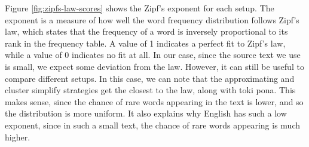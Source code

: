 Figure \ref{fig:zipfs-law-scores} shows the Zipf's exponent for each setup. The exponent is a measure of how well the word frequency distribution follows Zipf's law,
which states that the frequency of a word is inversely proportional to its rank in the frequency table.
A value of 1 indicates a perfect fit to Zipf's law, while a value of 0 indicates no fit at all. In our case, since the source text we use is small, we expect
some deviation from the law. However, it can still be useful to compare different setups. In this case, we can note that the approximating and cluster simplify strategies
get the closest to the law, along with toki pona. This makes sense, since the chance of rare words appearing in the text is lower, and so the distribution is more uniform.
It also explains why English has such a low exponent, since in such a small text, the chance of rare words appearing is much higher.



